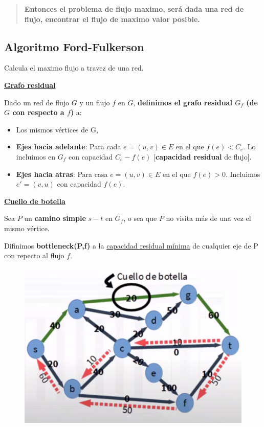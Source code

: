 \documentclass{article}
\begin{document}
\begin{quote}
    \textbf{Entonces el problema de flujo maximo, será dada una red de flujo, encontrar el flujo de maximo valor posible.}
\end{quote}


\newpage
\subsection{Algoritmo Ford-Fulkerson}

Calcula el maximo flujo a travez de una red.

\noindent
\underline{\textbf{Grafo residual}}

Dado un red de flujo \(G\) y un flujo \(f\) en \(G\), 
\textbf{definimos el grafo residual \(G_f\) (de \(G\) con respecto a \(f\))} a:

\begin{itemize}
    \item Los mismos vértices de G,
    \item \textbf{Ejes hacia adelante}: Para cada \(e=(u,v) \in E\) en el que \(f(e) < C_e\). 
    Lo incluimos en \(G_f\) con capacidad \(C_e-f(e)\) [\textbf{capacidad residual} de flujo].
    \item \textbf{Ejes hacia atras}: Para casa \(e=(u,v) \in E\) en el que \(f(e) > 0\). 
    Incluimos \(e'=(v,u)\) con capacidad \(f(e)\).
\end{itemize}

\noindent
\underline{\textbf{Cuello de botella}}

Sea \(P\) un \textbf{camino simple} \(s-t\) en \(G_f\), o sea que \(P\) no visita más de una vez el mismo vértice.

Difinimos \textbf{bottleneck(P,f)} a la \underline{capacidad residual mínima} de cualquier eje de P con repecto al flujo \(f\).

\begin{figure}[h!]
    \includegraphics[width=\linewidth]{imagenes/cuello-de-botella.png}
\end{figure}
\end{document}
